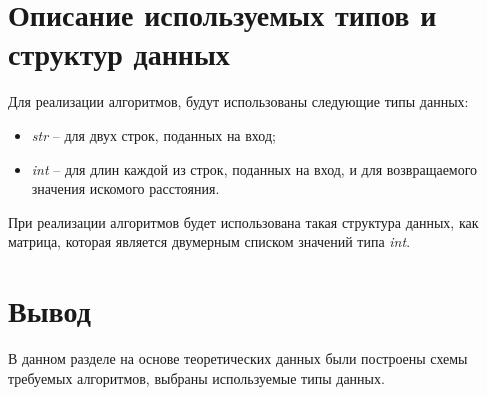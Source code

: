 \section{Описание используемых типов и структур данных}

Для реализации алгоритмов, будут использованы следующие типы данных:
\begin{itemize}
	\item \textit{str} -- для двух строк, поданных на вход;
	\item \textit{int} -- для длин каждой из строк, поданных на вход, и для возвращаемого значения искомого расстояния.
\end{itemize}

При реализации алгоритмов будет использована такая структура данных, как матрица, которая является двумерным списком значений типа \textit{int}.


\section*{Вывод}

В данном разделе на основе теоретических данных были построены схемы требуемых алгоритмов, выбраны используемые типы данных.
